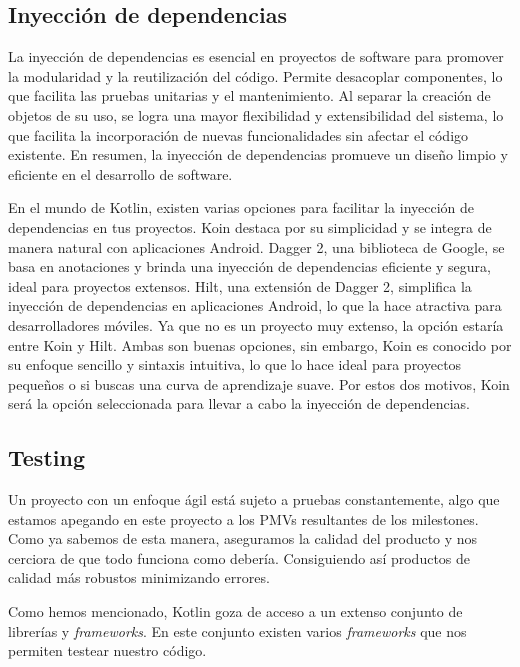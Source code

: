 \subsection{Inyección de dependencias}


La inyección de dependencias es esencial en proyectos de software \cite{DIart}\cite{BenDI} para 
promover la modularidad y la reutilización del código. Permite desacoplar componentes, lo que facilita 
las pruebas unitarias y el mantenimiento. Al separar la creación de objetos de su uso, se logra una 
mayor flexibilidad y extensibilidad del sistema, lo que facilita la incorporación de nuevas 
funcionalidades sin afectar el código existente. En resumen, la inyección de dependencias promueve un 
diseño limpio y eficiente en el desarrollo de software.

En el mundo de Kotlin, existen varias opciones para facilitar la inyección de dependencias en tus 
proyectos. Koin destaca por su simplicidad y se integra de manera natural con aplicaciones Android. 
Dagger 2, una biblioteca de Google, se basa en anotaciones y brinda una inyección de dependencias 
eficiente y segura, ideal para proyectos extensos. Hilt, una extensión de Dagger 2, simplifica la 
inyección de dependencias en aplicaciones Android, lo que la hace atractiva para desarrolladores 
móviles. Ya que no es un proyecto muy extenso, la opción estaría entre Koin y Hilt. Ambas son buenas 
opciones, sin embargo, Koin es conocido por su enfoque sencillo y sintaxis intuitiva, lo que lo hace 
ideal para proyectos pequeños o si buscas una curva de aprendizaje suave. Por estos dos motivos, Koin 
será la opción seleccionada para llevar a cabo la inyección de dependencias.

\subsection{Testing}

Un proyecto con un enfoque ágil está sujeto a pruebas constantemente, algo que estamos apegando en este 
proyecto a los PMVs resultantes de los milestones. Como ya sabemos de esta manera, aseguramos la 
calidad del producto y nos cerciora de que todo funciona como debería. Consiguiendo así productos de 
calidad más robustos minimizando errores.

Como hemos mencionado, Kotlin goza de acceso a un extenso conjunto de librerías y \textit{frameworks}. 
En este conjunto existen varios \textit{frameworks} que nos permiten testear nuestro código.


